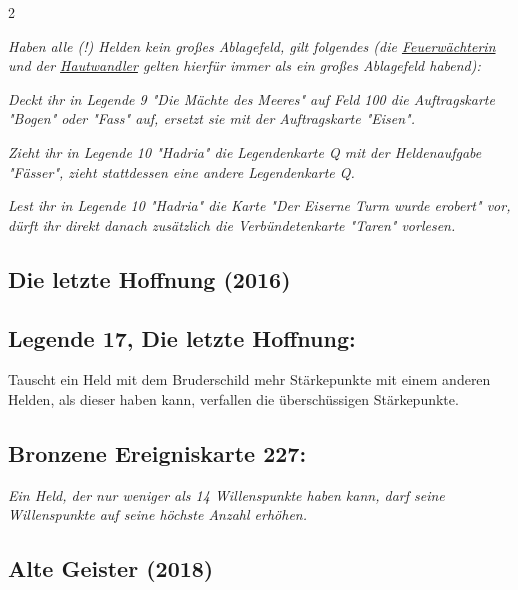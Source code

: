 \documentclass[10pt, a4paper, oneside]{book}
\newcommand{\fan}[1]{\textit{#1}}
\begin{document}
\begin{multicols*}{2}
\begin{bgcolor}
\fan{Haben alle (!) Helden kein großes Ablagefeld, gilt folgendes (die \hyperref[feuerwaechterin]{Feuerwächterin} und der \hyperref[hautwandler]{Hautwandler} gelten hierfür immer als ein großes Ablagefeld habend):}

\bullet{} \fan{Deckt ihr in Legende 9 "Die Mächte des Meeres" auf Feld 100 die Auftragskarte "Bogen" oder "Fass" auf, ersetzt sie mit der Auftragskarte "Eisen".}

\bullet{} \fan{Zieht ihr in Legende 10 "Hadria" die Legendenkarte Q mit der Heldenaufgabe "Fässer", zieht stattdessen eine andere Legendenkarte Q.}

\bullet{} \fan{Lest ihr in Legende 10 "Hadria" die Karte "Der Eiserne Turm wurde erobert" vor, dürft ihr direkt danach zusätzlich die Verbündetenkarte "Taren" vorlesen.}

\end{bgcolor}



\begin{bgcolor}
\section{Die letzte Hoffnung (2016)}





\subsection{Legende 17, Die letzte Hoffnung:}

Tauscht ein Held mit dem Bruderschild mehr Stärkepunkte mit einem anderen Helden, als dieser haben kann, verfallen die überschüssigen Stärkepunkte.


\subsection{Bronzene Ereigniskarte 227:}

\fan{Ein Held, der nur weniger als 14 Willenspunkte haben kann, darf seine Willenspunkte auf seine höchste Anzahl erhöhen.}


\end{bgcolor}





\begin{bgcolor}[color-ag]
\section{Alte Geister (2018)}


\end{bgcolor}
\end{multicols*}
\end{document}
